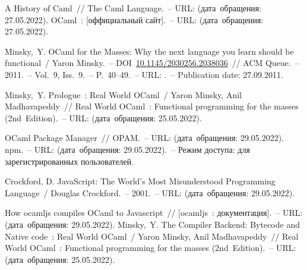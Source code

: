 \begin{thebibliography}{00}
      A History of Caml~// The Caml Language.~--
      URL: \underline{}
      (дата~обращения: 27.05.2022). 
      OCaml~: [оффициальный сайт].~--
      URL: \underline{}
      (дата~обращения: 27.05.2022).
    
      Minsky,~Y. OCaml for the Masses: Why the next language you learn should be functional~/ Yaron Minsky.~--
      DOI~\href{https://doi.org/10.1145/2030256.2038036}{10.1145/2030256.2038036}~//
      ACM Queue.~--
      2011.~--
      Vol.~9, Iss.~9.~--
      P.~40--49.~--
      URL: \underline{}.~--
      Publication date: 27.09.2011.
      
      Minsky,~Y. Prologue~: Real World OCaml~/
      Yaron Minsky, Anil Madhavapeddy~//
      Real World OCaml~: Functional programming for the masses (2nd~Edition).~--
      URL: \underline{} (дата~обращения: 25.05.2022).
      
      OCaml Package Manager~// OPAM.~--
      URL: \underline{}
      (дата~обращения: 29.05.2022). 
      npm.~--
      URL: \underline{}
      (дата~обращения: 29.05.2022).~--
      Режим доступа: для зарегистрированных пользователей.
      
      Crockford, D. JavaScript: The World's Most Misunderstood Programming Language~/ Douglas Crockford.~--
      2001.~--
      URL: \underline{}
      (дата~обращения: 29.05.2022).
      
      How ocamljs compiles OCaml to Javascript~// [ocamljs~: документация].~--
      URL: \underline{}
      (дата~обращения: 29.05.2022). 
      Minsky,~Y. The Compiler Backend: Bytecode and Native code~: Real World OCaml~/
      Yaron Minsky, Anil Madhavapeddy~//
      Real World OCaml~: Functional programming for the masses (2nd~Edition).~--
      URL: \underline{} (дата~обращения: 25.05.2022).
      

\end{thebibliography}
